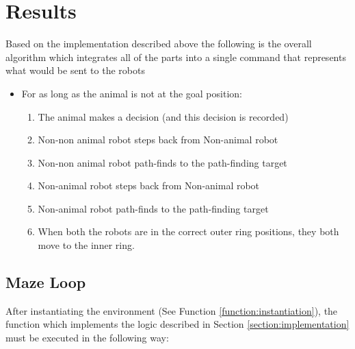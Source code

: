 \section{Results}

Based on the implementation described above the following is the overall algorithm which integrates all of the parts into a single command that represents what would be sent to the robots  

\begin{tcolorbox}
\begin{itemize}
    \item[] For as long as the animal is not at the goal position:
\begin{enumerate}
    \item The animal makes a decision (and this decision is recorded)
    \item Non-non animal robot steps back from Non-animal robot
    \item Non-non animal robot path-finds to the path-finding target
    \item Non-animal robot steps back from Non-animal robot
    \item Non-animal robot path-finds to the path-finding target
    \item When both the robots are in the correct outer ring positions, they both move to the inner ring.
\end{enumerate}
\end{itemize}
\end{tcolorbox}
\subsection{Maze Loop}
\label{function:maze_loop}

After instantiating the environment (See Function \ref{function:instantiation}), the function which implements the logic described in Section \ref{section:implementation} must be executed in the following way:


